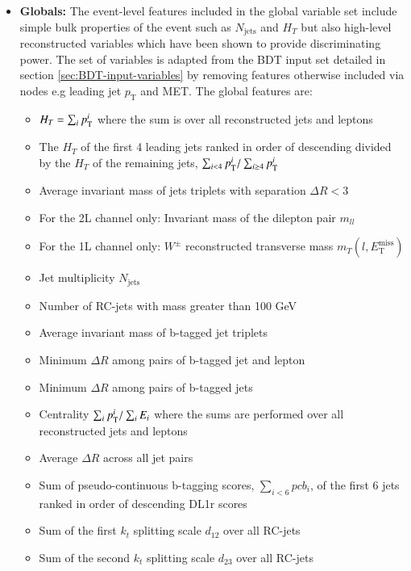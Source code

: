 \begin{itemize}
\item \textbf{Globals:} The event-level features included in the global variable set include simple bulk properties of the event such as $N_\mathrm{jets}$ and $H_T$ but also high-level reconstructed variables which have been shown to provide discriminating power. The set of variables is adapted from the BDT input set detailed in section \ref{sec:BDT-input-variables} by removing features otherwise included via nodes e.g leading jet $p_\mathrm{T}$ and MET. The global features are:
    \begin{itemize}
        \item[--] $H_T=\sum_i p_{\text{T}}^i$ where the sum is over all reconstructed jets and leptons
        \item[--] The $H_T$ of the first 4 leading jets ranked in order of descending \pt divided by the $H_T$ of the remaining jets, $\sum_{i<4}p_{\text{T}}^i/\sum_{i\geq4}p_{\text{T}}^i$
        \item[--] Average invariant mass of jets triplets with separation $\Delta R<3$
        \item[--] For the 2L channel only: Invariant mass of the dilepton pair  $m_{ll}$
        \item[--] For the 1L channel only: $W^\pm$ reconstructed transverse mass $m_T(l,E_\mathrm{T}^\mathrm{miss})$
        \item[--] Jet multiplicity $N_\mathrm{jets}$
        \item[--] Number of RC-jets with mass greater than 100 GeV
        \item[--] Average invariant mass of b-tagged jet triplets
        \item[--] Minimum $\Delta R$ among pairs of b-tagged jet and lepton
        \item[--] Minimum $\Delta R$ among pairs of b-tagged jets
        \item[--] Centrality $\sum_i p_{\text{T}}^i/\sum_i E_i$ where the sums are performed over all reconstructed jets and leptons
        \item[--] Average $\Delta R$ across all jet pairs
        \item[--] Sum of pseudo-continuous b-tagging scores, $\sum_{i<6}pcb_i$, of the first 6 jets ranked in order of descending DL1r scores
        \item[--] Sum of the first $k_t$ splitting scale $d_{12}$ over all RC-jets
        \item[--] Sum of the second $k_t$ splitting scale $d_{23}$ over all RC-jets
    \end{itemize}

\end{itemize}


